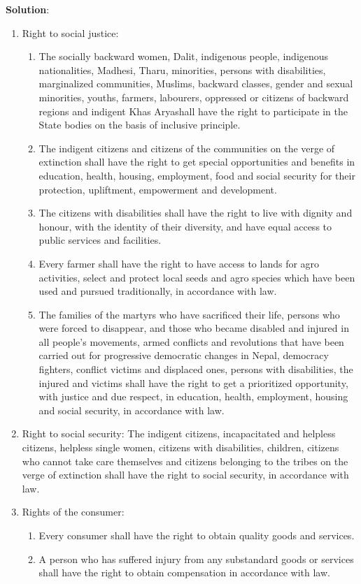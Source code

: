 \documentclass[
]{book}
\newenvironment{solution}{ {\bfseries Solution}:}{}
\begin{document}
\begin{questions}
\begin{solution}
\begin{enumerate}
\item Right to social justice:
\begin{enumerate}
\item The socially backward women, Dalit, indigenous people, indigenous nationalities, Madhesi, Tharu, minorities, persons with disabilities, marginalized communities, Muslims, backward classes, gender and sexual minorities, youths, farmers, labourers, oppressed or citizens of backward regions and indigent Khas Aryashall have the right to participate in the State bodies on the basis of inclusive principle.
\item The indigent citizens and citizens of the communities on the verge of extinction shall have the right to get special opportunities and benefits in education, health, housing, employment, food and social security for their protection, upliftment, empowerment and development.
\item The citizens with disabilities shall have the right to live with dignity and honour, with the identity of their diversity, and have equal access to public services and facilities.
\item Every farmer shall have the right to have access to lands for agro activities, select and protect local seeds and agro species which have been used and pursued traditionally, in accordance with law.
\item The families of the martyrs who have sacrificed their life, persons who were forced to disappear, and those who became disabled and injured in all people's movements, armed conflicts and revolutions that have been carried out for progressive democratic changes in Nepal, democracy fighters, conflict victims and displaced ones, persons with disabilities, the injured and victims shall have the right to get a prioritized opportunity, with justice and due respect, in education, health, employment, housing and social security, in accordance with law.
\end{enumerate}

\item Right to social security: The indigent citizens, incapacitated and helpless citizens, helpless single women, citizens with disabilities, children, citizens who cannot take care themselves and citizens belonging to the tribes on the verge of extinction shall have the right to social security, in accordance with law.

\item Rights of the consumer:
\begin{enumerate}
\item Every consumer shall have the right to obtain quality goods and services.
\item A person who has suffered injury from any substandard goods or services shall have the right to obtain compensation in accordance with law.
\end{enumerate}


\end{enumerate}
\end{solution}
\end{questions}
\end{document}
